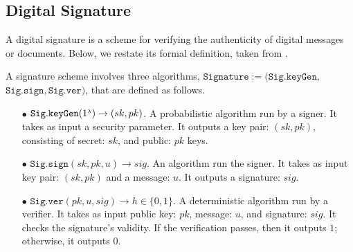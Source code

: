 













\subsection{Digital Signature}\label{subsec:DS}

A digital signature is a scheme for verifying the authenticity of digital messages or documents. Below, we restate its formal definition, taken from \cite{DBLP:books/crc/KatzLindell2014}. 


\begin{definition}\label{sec::def}
A signature scheme  involves three algorithms, $\mathtt{Signature}:=(\mathtt{Sig.keyGen}, $ $\mathtt{Sig.sign}, \mathtt{Sig.ver})$, that are defined as follows.

\begin{itemize} 
\item[$\bullet$] $\mathtt{Sig.keyGen}(1^{\scriptscriptstyle \lambda})\rightarrow (sk,pk)$.  A probabilistic algorithm run by  a  signer. It takes as input a security parameter. It outputs a key pair: $(sk,pk)$, consisting of secret: $sk$, and public: $pk$ keys. 
\item[$\bullet$] $\mathtt{Sig.sign}(sk, pk, u)\rightarrow sig$. An algorithm run  the signer. It takes as input  key pair: $(sk,pk)$ and a message: $u$. It outputs a signature: $sig$.
\item[$\bullet$]  $\mathtt{Sig.ver}( pk, u, sig)\rightarrow h\in\{0,1\}$. A deterministic algorithm run by a verifier. It takes as input  public key: $pk$,  message: $u$, and signature: $sig$. It checks the signature's validity.   If the verification passes, then it outputs $1$; otherwise, it outputs $0$. 
\end{itemize}
\end{definition}

